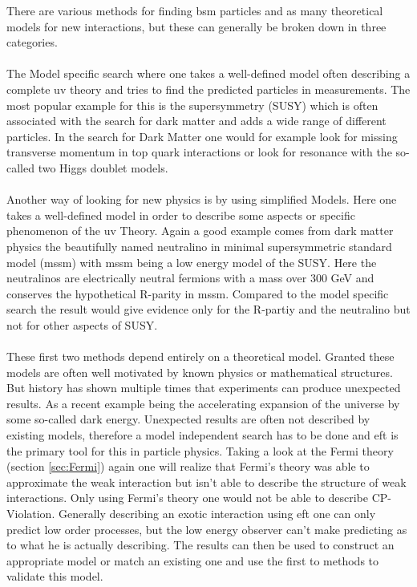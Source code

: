 \documentclass[../Bachelorarbeit.tex]{subfiles}
\begin{document}
There are various methods for finding \acrshort{bsm} particles and as many theoretical models for new interactions, but these can generally be broken down in three categories.
\\\\
The Model specific search where one takes a well-defined model often describing a complete \acrshort{uv} theory and tries to find the predicted particles in measurements.
The most popular example for this is the supersymmetry (SUSY) which is often associated with the search for dark matter and adds a wide range of different particles.
In the search for Dark Matter one would for example look for missing transverse momentum in top quark interactions or look for resonance with the so-called
two Higgs doublet models.
\\\\
Another way of looking for new physics is by using simplified Models. Here one takes a well-defined model in order to describe some aspects or specific phenomenon of the \acrshort{uv} Theory.
Again a good example comes from dark matter physics the beautifully named neutralino in minimal supersymmetric standard model (\acrshort{mssm}) with \acrshort{mssm} being a low energy model of the SUSY.
Here the neutralinos are electrically neutral fermions with a mass over 300 GeV and conserves the hypothetical R-parity in \acrshort{mssm}. Compared to the model specific search the result
would give evidence only for the R-partiy and the neutralino but not for other aspects of SUSY.
\\\\
These first two methods depend entirely on a theoretical model. Granted these models are often well motivated by known physics or mathematical structures.
But history has shown multiple times that experiments can produce unexpected results. As a recent example being the accelerating expansion of the universe by some so-called dark energy.
Unexpected results are often not described by existing models, therefore a model independent search has to be done and \acrshort{eft} is the primary tool for this in particle physics.
Taking a look at the Fermi theory (section \ref{sec:Fermi}) again one will realize that Fermi's theory was able to approximate the weak interaction but isn't able to describe the
structure of weak interactions. Only using Fermi's theory one would not be able to describe CP-Violation. Generally describing an exotic interaction using \acrshort{eft} one can only predict low order
processes, but the low energy observer can't make predicting as to what he is actually describing. The results can then be used to construct an appropriate model or match an existing one and
use the first to methods to validate this model.
\end{document}
